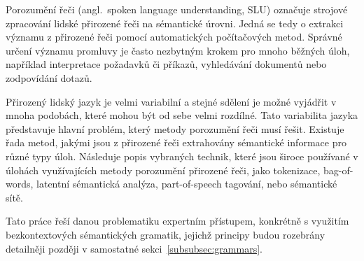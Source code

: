 Porozumění řeči (angl.~spoken language understanding, SLU) označuje strojové zpracování lidské přirozené řeči na sémantické úrovni.
Jedná se tedy o extrakci významu z přirozené řeči pomocí automatických počítačových metod.
Správné určení významu promluvy je často nezbytným krokem pro mnoho běžných úloh, například interpretace požadavků či příkazů,
vyhledávání dokumentů nebo zodpovídání dotazů.~\cite{the_conversational_interface}

Přirozený lidský jazyk je velmi variabilní a stejné sdělení je možné vyjádřit v mnoha podobách, které mohou být od sebe velmi rozdílné.
Tato variabilita jazyka představuje hlavní problém, který metody porozumění řeči musí řešit.
Existuje řada metod, jakými jsou z přirozené řeči extrahovány sémantické informace pro různé typy úloh.
Následuje popis vybraných technik, které jsou široce používané v úlohách využívajících
metody porozumění přirozené řeči, jako tokenizace, bag-of-words, latentní sémantická analýza, part-of-speech tagování, nebo sémantické sítě.~\cite{the_conversational_interface}

Tato práce řeší danou problematiku expertním přístupem, konkrétně s využitím bezkontextových sémantických gramatik,
jejichž principy budou rozebrány detailněji později v samostatné sekci~\ref{subsubsec:grammars}.

